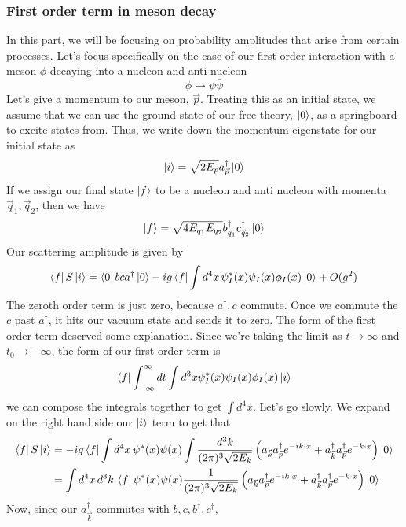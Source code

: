 \documentclass[11pt, oneside]{article}   	%
\theoremstyle{newline}
\theoremstyle{newline}
\theoremstyle{newline}
\theoremstyle{newline}
\theoremstyle{newline}
\begin{document}
\subsubsection{First order term in meson decay}
In this part, we will be focusing on probability 
amplitudes that arise from certain processes. 
Let's focus specifically on the case 
of our first order interaction with a meson  $ \phi $ 
decaying into a nucleon and anti-nucleon
\[
\phi \to \psi \overline{ \psi }
\] Let's give a momentum to our meson, $ \vec{p}$. 
Treating this as an initial state, we assume that 
we can use the ground state of our free theory, $ \ket{ 0 } $, 
as a springboard to excite states from. Thus, we write down 
the momentum eigenstate for our initial state as 
\[
\ket{ i } = \sqrt{ 2E_{ p   } } a_{ \vec{p} }^ \dagger \ket{ 0 }  
\] If we assign our final state $ \ket{ f  } $ to be  
a nucleon and anti nucleon with momenta $ \vec{q}_1,  \vec{q}_ 2 $, 
then we have 
\[
\ket{ f  }  = \sqrt{ 4 E_{ q_1 } E_{ q _ 2 } }  b_{ \vec{q}_ 1 }^ \dagger c_{ \vec{q}_ 2 }^\dagger \ket{ 0 } 
\]  
Our scattering amplitude is given by 
\[\bra{ f } S \ket{ i } = \bra{ 0 } bc a ^ \dagger \ket{ 0 } - ig \bra{ f }  \int d^4 x \, \psi_I^* ( x) \psi_I  ( x) \phi_I ( x) \ket{ 0 }  + O ( g ^ 2 ) \] The zeroth order term is just zero, because $ a^ \dagger , c $ commute. 
Once we commute the $c $ past $ a ^ \dagger $, it hits our vacuum 
state and sends it to zero. 
The form of the first order term deserved some explanation. 
Since we're taking the limit as $ t \to \infty $ and $ t_0 \to  - \infty $, 
the form of our first order term is 
\[
\bra{ f} \int_{ - \infty }^\infty dt \int d^ 3 x \psi^ *_ I  ( x) \psi_ I  ( x) \phi_I  ( x)  \ket{ i } 
\] we can compose the integrals together to get $ \int d^4 x $.
Let's go slowly. We expand on the right hand side our $ \ket{ i } $ term 
to get that 
\begin{align*}
\bra { f} S \ket{ i } & = - i g \bra{f} \int d^ 4 x \, \psi ^ * ( x) \psi ( x) \int \frac{ d^ 3 k }{ ( 2 \pi ) ^ 3  \sqrt{ 2 E_{ k  } }  	 } \left(  a_{ \vec{k} } a_{ \vec{p} } ^ \dagger e ^{  - i k \cdot  x } + a_{ \vec{k} } ^ \dagger a_{ \vec{p} } ^ \dagger e^{ - k \cdot  x } \right) \ket{ 0 }  \\
      & =    \int d^ 4 x \, d^ 3 k  \, \bra{f} \psi ^ * ( x) \psi ( x) \frac{ 1 }{ ( 2 \pi ) ^ 3  \sqrt{ 2 E_{ k  } }  	 } \left(  a_{ \vec{k} } a_{ \vec{p} } ^ \dagger e ^{  - i k \cdot  x } + a_{ \vec{k} } ^ \dagger a_{ \vec{p} } ^ \dagger e^{ - k \cdot  x } \right) \ket{ 0 }
\end{align*} Now, since our $ a_{ \vec{k} } ^ \dagger $ commutes with $ b, c, b ^ \dagger, c^ \dagger $, 
\end{document}
